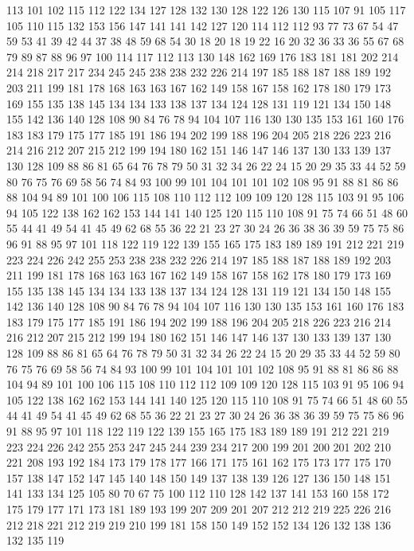 113 101 102 115 112 122 134 127 128 132 130 128 122 126 130 115 107 91 105 117
105 110 115 132 153 156 147 141 141 142 127 120 114 112 112 93 77 73 67 54
47 59 53 41 39 42 44 37 38 48 59 68 54 30 18 20 18 19 22 16
20 32 36 33 36 55 67 68 79 89 87 88 96 97 100 114 117 112 113 130
148 162 169 176 183 181 181 202 214 214 218 217 217 234 245 245 238 238 232 226
214 197 185 188 187 188 189 192 203 211 199 181 178 168 163 163 167 162 149 158
167 158 162 178 180 179 173 169 155 135 138 145 134 134 133 138 137 134 124 128
131 119 121 134 150 148 155 142 136 140 128 108 90 84 76 78 94 104 107 116
130 130 135 153 161 160 176 183 183 179 175 177 185 191 186 194 202 199 188 196
204 205 218 226 223 216 214 216 212 207 215 212 199 194 180 162 151 146 147 146
137 130 133 139 137 130 128 109 88 86 81 65 64 76 78 79 50 31 32 34
26 22 24 15 20 29 35 33 44 52 59 80 76 75 76 69 58 56 74 84
93 100 99 101 104 101 101 102 108 95 91 88 81 86 86 88 104 94 89 101
100 106 115 108 110 112 112 109 109 120 128 115 103 91 95 106 94 105 122 138
162 162 153 144 141 140 125 120 115 110 108 91 75 74 66 51 48 60 55 44
41 49 54 41 45 49 62 68 55 36 22 21 23 27 30 24 26 36 38 36
39 59 75 75 86 96 91 88 95 97 101 118 122 119 122 139 155 165 175 183
189 189 191 212 221 219 223 224 226 242 255 253 238 238 232 226 214 197 185 188
187 188 189 192 203 211 199 181 178 168 163 163 167 162 149 158 167 158 162 178
180 179 173 169 155 135 138 145 134 134 133 138 137 134 124 128 131 119 121 134
150 148 155 142 136 140 128 108 90 84 76 78 94 104 107 116 130 130 135 153
161 160 176 183 183 179 175 177 185 191 186 194 202 199 188 196 204 205 218 226
223 216 214 216 212 207 215 212 199 194 180 162 151 146 147 146 137 130 133 139
137 130 128 109 88 86 81 65 64 76 78 79 50 31 32 34 26 22 24 15
20 29 35 33 44 52 59 80 76 75 76 69 58 56 74 84 93 100 99 101
104 101 101 102 108 95 91 88 81 86 86 88 104 94 89 101 100 106 115 108
110 112 112 109 109 120 128 115 103 91 95 106 94 105 122 138 162 162 153 144
141 140 125 120 115 110 108 91 75 74 66 51 48 60 55 44 41 49 54 41
45 49 62 68 55 36 22 21 23 27 30 24 26 36 38 36 39 59 75 75
86 96 91 88 95 97 101 118 122 119 122 139 155 165 175 183 189 189 191 212
221 219 223 224 226 242 255 253 247 245 244 239 234 217 200 199 201 200 201 202
210 221 208 193 192 184 173 179 178 177 166 171 175 161 162 175 173 177 175 170
157 138 147 152 147 145 140 148 150 149 137 138 139 126 127 136 150 148 151 141
133 134 125 105 80 70 67 75 100 112 110 128 142 137 141 153 160 158 172 175
179 177 171 173 181 189 193 199 207 209 201 207 212 212 219 225 226 216 212 218
221 212 219 219 210 199 181 158 150 149 152 152 134 126 132 138 136 132 135 119

